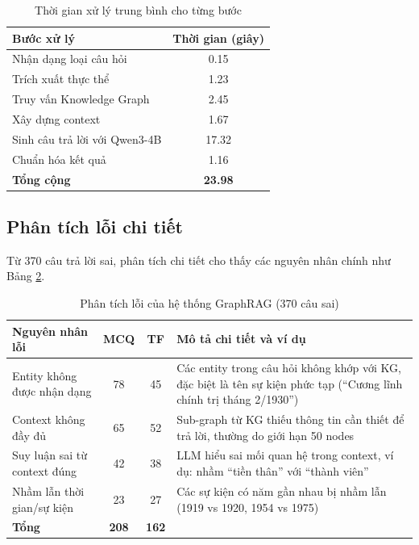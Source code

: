 \begin{table}[H]
\centering
\caption{Thời gian xử lý trung bình cho từng bước}
\label{tab:processing-time}
\begin{tabular}{|l|c|}
\hline
\textbf{Bước xử lý} & \textbf{Thời gian (giây)} \\
\hline
Nhận dạng loại câu hỏi & 0.15 \\
Trích xuất thực thể & 1.23 \\
Truy vấn Knowledge Graph & 2.45 \\
Xây dựng context & 1.67 \\
Sinh câu trả lời với Qwen3-4B & 17.32 \\
Chuẩn hóa kết quả & 1.16 \\
\hline
\textbf{Tổng cộng} & \textbf{23.98} \\
\hline
\end{tabular}
\end{table}

\subsection{Phân tích lỗi chi tiết}

Từ 370 câu trả lời sai, phân tích chi tiết cho thấy các nguyên nhân chính như Bảng \ref{tab:error-analysis}.

\begin{table}[H]
\centering
\caption{Phân tích lỗi của hệ thống GraphRAG (370 câu sai)}
\label{tab:error-analysis}
\begin{tabular}{|l|c|c|p{7cm}|}
\hline
\textbf{Nguyên nhân lỗi} & \textbf{MCQ} & \textbf{TF} & \textbf{Mô tả chi tiết và ví dụ} \\
\hline
Entity không được nhận dạng & 78 & 45 & Các entity trong câu hỏi không khớp với KG, đặc biệt là tên sự kiện phức tạp (``Cương lĩnh chính trị tháng 2/1930'') \\
\hline
Context không đầy đủ & 65 & 52 & Sub-graph từ KG thiếu thông tin cần thiết để trả lời, thường do giới hạn 50 nodes \\
\hline
Suy luận sai từ context đúng & 42 & 38 & LLM hiểu sai mối quan hệ trong context, ví dụ: nhầm ``tiền thân'' với ``thành viên'' \\
\hline
Nhầm lẫn thời gian/sự kiện & 23 & 27 & Các sự kiện có năm gần nhau bị nhầm lẫn (1919 vs 1920, 1954 vs 1975) \\
\hline
\textbf{Tổng} & \textbf{208} & \textbf{162} & \\
\hline
\end{tabular}
\end{table}

